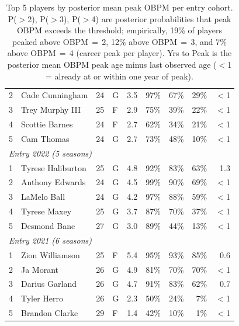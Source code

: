 \begin{table}[htbp]
\begin{tabular}{rlrlrrrrr}
    2 & Cade Cunningham & 24 & G & 3.5 & 97\% & 67\% & 29\% & $<$1 \\
    3 & Trey Murphy III & 25 & F & 2.9 & 75\% & 39\% & 22\% & $<$1 \\
    4 & Scottie Barnes & 24 & F & 2.7 & 62\% & 34\% & 21\% & $<$1 \\
    5 & Cam Thomas & 24 & G & 2.7 & 73\% & 48\% & 10\% & $<$1 \\
    \midrule[0.4pt]
    \multicolumn{9}{l}{\textit{Entry 2022 (5 seasons)}} \\
    \midrule
    1 & Tyrese Haliburton & 25 & G & 4.8 & 92\% & 83\% & 63\% & 1.3 \\
    2 & Anthony Edwards & 24 & G & 4.5 & 99\% & 90\% & 69\% & $<$1 \\
    3 & LaMelo Ball & 24 & G & 4.2 & 97\% & 88\% & 59\% & $<$1 \\
    4 & Tyrese Maxey & 25 & G & 3.7 & 87\% & 70\% & 37\% & $<$1 \\
    5 & Desmond Bane & 27 & G & 3.0 & 89\% & 44\% & 13\% & $<$1 \\
    \midrule[0.4pt]
    \multicolumn{9}{l}{\textit{Entry 2021 (6 seasons)}} \\
    \midrule
    1 & Zion Williamson & 25 & F & 5.4 & 95\% & 93\% & 85\% & 0.6 \\
    2 & Ja Morant & 26 & G & 4.9 & 81\% & 70\% & 70\% & $<$1 \\
    3 & Darius Garland & 26 & G & 4.7 & 91\% & 83\% & 62\% & 0.7 \\
    4 & Tyler Herro & 26 & G & 2.3 & 50\% & 24\% & 7\% & $<$1 \\
    5 & Brandon Clarke & 29 & F & 1.4 & 42\% & 10\% & 1\% & $<$1 \\
    \bottomrule
  \end{tabular}
  \caption{Top 5 players by posterior mean peak OBPM per entry cohort. P($>$2), P($>$3), P($>$4) are posterior probabilities that peak OBPM exceeds the threshold; empirically, 19\% of players peaked above OBPM\,$=$\,2, 12\% above OBPM\,$=$\,3, and 7\% above OBPM\,$=$\,4 (career peak per player). Yrs to Peak is the posterior mean OBPM peak age minus last observed age ($<$1 = already at or within one year of peak).}
  \label{tab:breakout_cohort}
\end{table}

